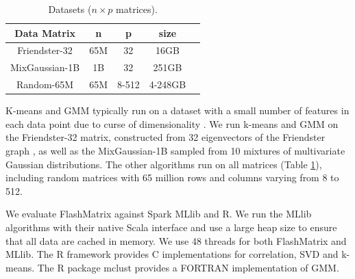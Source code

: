 \begin{table}
\begin{center}
\footnotesize
\begin{tabular}{|c|c|c|c|c|}
\hline
Data Matrix & n & p & size \\
\hline
Friendster-32 \cite{friendster} & 65M & 32 & 16GB \\
\hline
MixGaussian-1B & 1B & 32 & 251GB \\
\hline
Random-65M & 65M & 8-512 & 4-248GB \\
\hline
\end{tabular}
\normalsize
\end{center}
\vspace{-10pt}
\caption{Datasets ($n \times p$ matrices).}
\label{tbl:data}
\vspace{-10pt}
\end{table}

K-means and GMM typically run on a dataset with a small number of features
in each data point due to curse of dimensionality \cite{Jain00}.
We run k-means and GMM on
the Friendster-32 matrix, constructed from 32 eigenvectors of the Friendster
graph \cite{friendster}, as well as the MixGaussian-1B
sampled from 10 mixtures of multivariate Gaussian distributions.
The other algorithms run on all matrices (Table \ref{tbl:data}),
including random matrices with 65 million rows and columns
varying from 8 to 512.

%


We evaluate FlashMatrix against
Spark MLlib \cite{mllib} and R. We run the MLlib algorithms
with their native Scala interface and use a large heap size to ensure that
all data are cached in memory. We use 48 threads for both FlashMatrix and
MLlib. %
The R framework provides C implementations for correlation, SVD and k-means.
The R package mclust \cite{mclust} provides a FORTRAN implementation of GMM.

